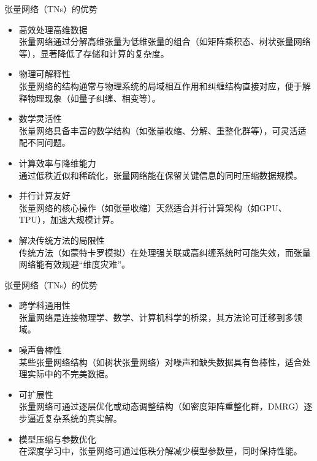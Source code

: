 \documentclass{beamer}
\begin{document}
\begin{frame}{张量网络（TNs）的优势}
    \begin{itemize}[<+-| alert@+>] %
        \item 高效处理高维数据 \\
        {\tiny 张量网络通过分解高维张量为低维张量的组合（如矩阵乘积态、树状张量网络等），显著降低了存储和计算的复杂度。}
        \item 物理可解释性 \\
        {\tiny 张量网络的结构通常与物理系统的局域相互作用和纠缠结构直接对应，便于解释物理现象（如量子纠缠、相变等）。}
        \item 数学灵活性 \\
        {\tiny 张量网络具备丰富的数学结构（如张量收缩、分解、重整化群等），可灵活适配不同问题。}
        \item 计算效率与降维能力 \\
        {\tiny 通过低秩近似和稀疏化，张量网络能在保留关键信息的同时压缩数据规模。}
        \item 并行计算友好 \\
        {\tiny 张量网络的核心操作（如张量收缩）天然适合并行计算架构（如GPU、TPU），加速大规模计算。}
        \item 解决传统方法的局限性 \\
        {\tiny 传统方法（如蒙特卡罗模拟）在处理强关联或高纠缠系统时可能失效，而张量网络能有效规避“维度灾难”。}
    \end{itemize}
\end{frame}

\begin{frame}{张量网络（TNs）的优势}
    \begin{itemize}
        \item<1-> 跨学科通用性 \\
        {\tiny 张量网络是连接物理学、数学、计算机科学的桥梁，其方法论可迁移到多领域。}
        \item<2-> 噪声鲁棒性 \\
        {\tiny 某些张量网络结构（如树状张量网络）对噪声和缺失数据具有鲁棒性，适合处理实际中的不完美数据。}
        \item<3-> 可扩展性 \\
        {\tiny 张量网络可通过逐层优化或动态调整结构（如密度矩阵重整化群，DMRG）逐步逼近复杂系统的真实解。}
        \item<4-> 模型压缩与参数优化 \\
        {\tiny 在深度学习中，张量网络可通过低秩分解减少模型参数量，同时保持性能。}
    \end{itemize}
\end{frame}
\end{document}
